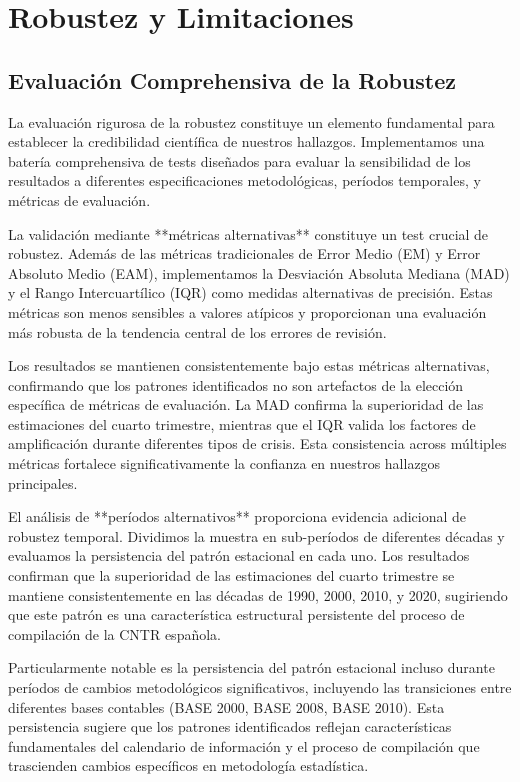 \documentclass[12pt,a4paper]{article}
\begin{document}
\section{Robustez y Limitaciones}

\subsection{Evaluación Comprehensiva de la Robustez}

La evaluación rigurosa de la robustez constituye un elemento fundamental para establecer la credibilidad científica de nuestros hallazgos. Implementamos una batería comprehensiva de tests diseñados para evaluar la sensibilidad de los resultados a diferentes especificaciones metodológicas, períodos temporales, y métricas de evaluación.

La validación mediante **métricas alternativas** constituye un test crucial de robustez. Además de las métricas tradicionales de Error Medio (EM) y Error Absoluto Medio (EAM), implementamos la Desviación Absoluta Mediana (MAD) y el Rango Intercuartílico (IQR) como medidas alternativas de precisión. Estas métricas son menos sensibles a valores atípicos y proporcionan una evaluación más robusta de la tendencia central de los errores de revisión.

Los resultados se mantienen consistentemente bajo estas métricas alternativas, confirmando que los patrones identificados no son artefactos de la elección específica de métricas de evaluación. La MAD confirma la superioridad de las estimaciones del cuarto trimestre, mientras que el IQR valida los factores de amplificación durante diferentes tipos de crisis. Esta consistencia across múltiples métricas fortalece significativamente la confianza en nuestros hallazgos principales.

El análisis de **períodos alternativos** proporciona evidencia adicional de robustez temporal. Dividimos la muestra en sub-períodos de diferentes décadas y evaluamos la persistencia del patrón estacional en cada uno. Los resultados confirman que la superioridad de las estimaciones del cuarto trimestre se mantiene consistentemente en las décadas de 1990, 2000, 2010, y 2020, sugiriendo que este patrón es una característica estructural persistente del proceso de compilación de la CNTR española.

Particularmente notable es la persistencia del patrón estacional incluso durante períodos de cambios metodológicos significativos, incluyendo las transiciones entre diferentes bases contables (BASE 2000, BASE 2008, BASE 2010). Esta persistencia sugiere que los patrones identificados reflejan características fundamentales del calendario de información y el proceso de compilación que trascienden cambios específicos en metodología estadística.
\end{document}
